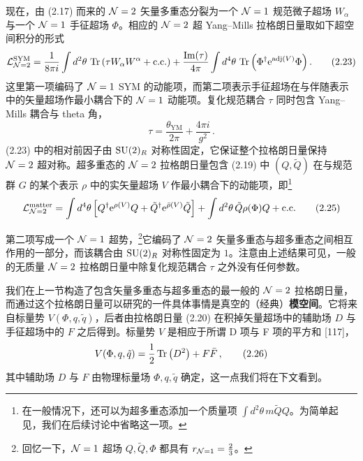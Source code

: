 现在，由 (2.17) 而来的 $\mathcal{N}=2$ 矢量多重态分裂为一个 $\mathcal{N}=1$ 规范微子超场 $W_\alpha$ 与一个 $\mathcal{N}=1$ 手征超场 $\Phi$。相应的 $\mathcal{N}=2$ 超 Yang--Mills 拉格朗日量取如下超空间积分的形式
\begin{equation}
  \mathcal{L}^{\mathrm{SYM}}_{\mathcal{N}=2}=\frac{1}{8\pi i}\int d^2\theta\,\operatorname{Tr}\left(\tau W_\alpha W^\alpha+\mathrm{c.c.}\right)
  +\frac{\operatorname{Im}(\tau)}{4\pi}\int d^4\theta\,\operatorname{Tr}\left(\Phi^\dagger \mathrm{e}^{\mathrm{adj}(V)}\Phi\right).
  \tag{2.23}
\end{equation}
这里第一项编码了 $\mathcal{N}=1$ SYM 的动能项，而第二项表示手征超场在与伴随表示中的矢量超场作最小耦合下的 $\mathcal{N}=1$ 动能项。复化规范耦合 $\tau$ 同时包含 Yang--Mills 耦合与 theta 角，
\begin{equation}
  \tau=\frac{\theta_{\mathrm{YM}}}{2\pi}+\frac{4\pi i}{g^2}\,.
  \tag{2.24}
\end{equation}
(2.23) 中的相对前因子由 $\mathrm{SU}(2)_R$ 对称性固定，它保证整个拉格朗日量保持 $\mathcal{N}=2$ 超对称。超多重态的 $\mathcal{N}=2$ 拉格朗日量包含 (2.19) 中 $(Q,\tilde Q)$ 在与规范群 $G$ 的某个表示 $\rho$ 中的实矢量超场 $V$ 作最小耦合下的动能项，即\footnote{在一般情况下，还可以为超多重态添加一个质量项 $\int d^2\theta\,m\tilde QQ$。为简单起见，我们在后续讨论中省略这一项。}
\begin{equation}
  \mathcal{L}^{\mathrm{matter}}_{\mathcal{N}=2}
  =\int d^4\theta\left[Q^\dagger \mathrm{e}^{\rho(V)}Q+\tilde Q^\dagger \mathrm{e}^{\bar\rho(V)}\tilde Q\right]
  +\int d^2\theta\,\tilde Q\rho(\Phi)Q+\mathrm{c.c.}
  \tag{2.25}
\end{equation}

第二项写成一个 $\mathcal{N}=1$ 超势，\footnote{回忆一下，$\mathcal{N}=1$ 超场 $Q,\tilde Q,\Phi$ 都具有 $r_{\mathcal{N}=1}=\frac23$。}它编码了 $\mathcal{N}=2$ 矢量多重态与超多重态之间相互作用的一部分，而该耦合由 $\mathrm{SU}(2)_R$ 对称性固定为 $1$。注意由上述结果可见，一般的无质量 $\mathcal{N}=2$ 拉格朗日量中除复化规范耦合 $\tau$ 之外没有任何参数。


我们在上一节构造了包含矢量多重态与超多重态的最一般的 $\mathcal{N}=2$ 拉格朗日量，而通过这个拉格朗日量可以研究的一件具体事情是真空的（经典）\textbf{模空间}。它将来自标量势 $V(\Phi,q,\tilde q)$，后者由拉格朗日量 (2.20) 在积掉矢量超场中的辅助场 $D$ 与手征超场中的 $F$ 之后得到。标量势 $V$ 是相应于所谓 D 项与 F 项的平方和 [117]，
\begin{equation}
  V(\Phi,q,\tilde q)=\frac12\operatorname{Tr}\left(D^2\right)+F\bar F\,,
  \tag{2.26}
\end{equation}
其中辅助场 $D$ 与 $F$ 由物理标量场 $\Phi,q,\tilde q$ 确定，这一点我们将在下文看到。

